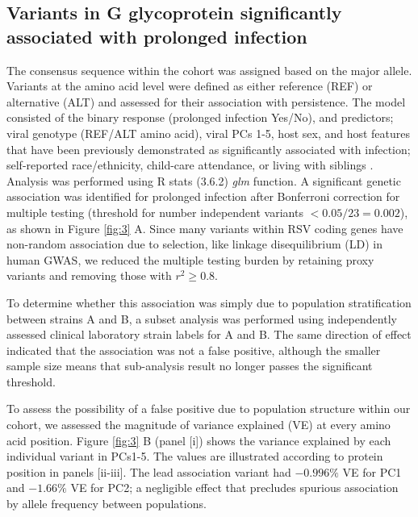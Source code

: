 \documentclass{article} %
\begin{document}
\subsection{Variants in G glycoprotein significantly associated with prolonged infection}
The consensus sequence within the cohort was assigned based on the major allele.
Variants at the amino acid level were defined as either reference (REF) or alternative (ALT) and assessed for their association with persistence.
The model consisted of 
the binary response (prolonged infection Yes/No),
and predictors; viral genotype (REF/ALT amino acid), viral PCs 1-5, host sex, and host features that have been previously demonstrated as significantly associated with infection;
self-reported race/ethnicity, child-care attendance, or living with siblings
\citep{hall1976respiratory}.
Analysis was performed using R stats (3.6.2) \textit{glm} function. 
A significant genetic association was identified for prolonged infection after Bonferroni correction for multiple testing (threshold for number independent variants $< 0.05/23 = 0.002$), 
as shown in 
Figure \ref{fig:3} A. 
Since many variants within RSV coding genes have non-random association due to selection, like linkage disequilibrium (LD) in human GWAS, 
we reduced the multiple testing burden by retaining proxy variants and removing those with
$r^2 \ge 0.8$.

To determine whether this association was simply due to population stratification between strains A and B, a subset analysis was performed using independently assessed clinical laboratory strain labels for A and B.
The same direction of effect indicated that the association was not a false positive, although the smaller sample size means that sub-analysis result no longer passes the significant threshold. 

To assess the possibility of a false positive due to population structure within our cohort,
we assessed the magnitude of variance explained (VE) at every amino acid position.
Figure \ref{fig:3} B (panel [i]) shows the variance explained by each individual variant in PCs1-5.
The values are illustrated according to protein position in panels [ii-iii].
The lead association variant had 
$-0.996\%$ VE for PC1 and $-1.66\%$ VE for PC2; 
a negligible effect that precludes spurious association by allele frequency between populations.
\end{document}
